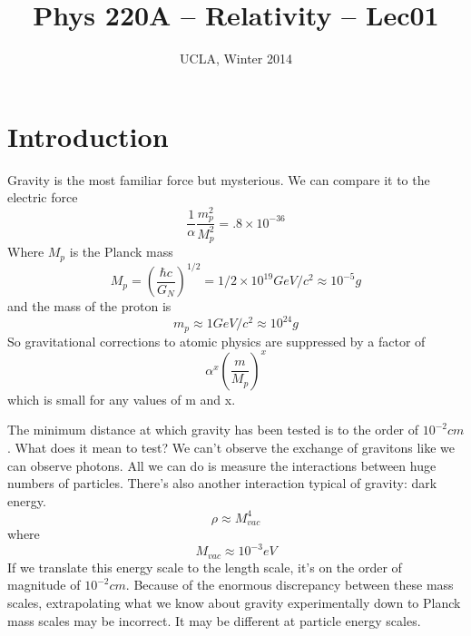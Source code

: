 
\usepackage[margin=1in]{geometry} %





\title{Phys 220A -- Relativity -- Lec01}
\author{UCLA, Winter 2014}
\date{} %


\setlength{\unitlength}{1mm}
\maketitle

\section{Introduction}
Gravity is the most familiar force but mysterious. We can compare it to the electric force
\begin{equation}
\frac{1}{\alpha} \frac{m_p^2}{M_p^2} = .8 \times 10^{-36}
\end{equation}
Where $M_p$ is the Planck mass
\begin{equation}
M_p = \left(\frac{\hbar c}{G_N}\right)^{1/2} = 1/2 \times 10^19 GeV/c^2  \approx 10^{-5} g
\end{equation}
and the mass of the proton is
\begin{equation}
m_p \approx 1 GeV/c^2 \approx 10^{24} g
\end{equation}
So gravitational corrections to atomic physics are suppressed by a factor of
\begin{equation}
\alpha^x \left(\frac{m}{M_p}\right)^x
\end{equation}
which is small for any values of m and x. 

The minimum distance at which gravity has been tested is to the order
of $10^{-2} cm$. What does it mean to test? We can't observe the
exchange of gravitons like we can observe photons. All we can do is
measure the interactions between huge numbers of particles. There's
also another interaction typical of gravity: dark energy. 
\begin{equation}
\rho \approx M_{vac}^4
\end{equation}
where
\begin{equation}
M_{vac} \approx 10^{-3} eV
\end{equation}
If we translate this energy scale to the length scale, it's on the
order of magnitude of $10^{-2}cm$. Because of the enormous
discrepancy between these mass scales, extrapolating what we know about
gravity experimentally down to Planck mass scales may be incorrect. It
may be different at particle energy scales. 

